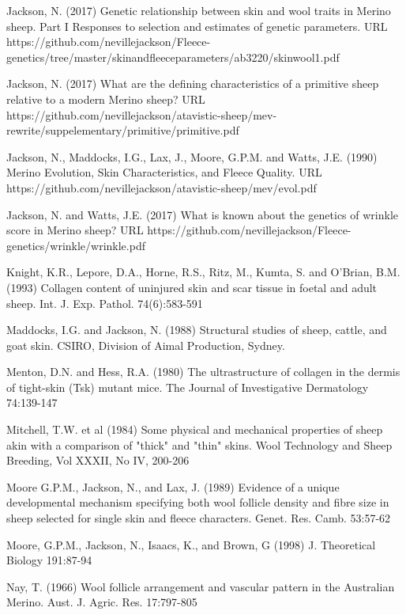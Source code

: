 \documentclass[titlepage]{article}  %
\begin{document}
\begin{thebibliography}{99}
Jackson, N. (2017) Genetic relationship between skin and wool traits in Merino sheep. Part I Responses to selection and estimates of genetic parameters. URL https://github.com/nevillejackson/Fleece-genetics/tree/master/skinandfleeceparameters/ab3220/skinwool1.pdf

Jackson, N. (2017) What are the defining characteristics of a primitive sheep relative to a modern Merino sheep? URL https://github.com/nevillejackson/atavistic-sheep/mev-rewrite/suppelementary/primitive/primitive.pdf

Jackson, N., Maddocks, I.G., Lax, J., Moore, G.P.M. and Watts, J.E. (1990) Merino Evolution, Skin Characteristics, and Fleece Quality. URL https://github.com/nevillejackson/atavistic-sheep/mev/evol.pdf 

Jackson, N. and Watts, J.E. (2017) What is known about the genetics of wrinkle score in Merino sheep? URL https://github.com/nevillejackson/Fleece-genetics/wrinkle/wrinkle.pdf

Knight, K.R., Lepore, D.A., Horne, R.S., Ritz, M., Kumta, S. and O'Brian, B.M. (1993) Collagen content of uninjured skin and scar tissue in foetal and adult sheep. Int. J. Exp. Pathol. 74(6):583-591

Maddocks, I.G. and Jackson, N. (1988) Structural studies of sheep, cattle, and goat skin. CSIRO, Division of Aimal Production, Sydney.

Menton, D.N. and Hess, R.A. (1980) The ultrastructure of collagen in the dermis of tight-skin (Tsk) mutant mice. The Journal of Investigative Dermatology 74:139-147

Mitchell, T.W. et al (1984) Some physical and mechanical properties of sheep akin with a comparison of "thick" and "thin" skins.  Wool Technology and Sheep Breeding, Vol XXXII, No IV, 200-206

Moore G.P.M., Jackson, N., and Lax, J. (1989) Evidence of a unique developmental mechanism specifying both wool follicle density and fibre size in sheep selected for single skin and fleece characters. Genet. Res. Camb. 53:57-62

Moore, G.P.M., Jackson, N., Isaacs, K., and Brown, G (1998) J. Theoretical Biology 191:87-94

Nay, T. (1966) Wool follicle arrangement and vascular pattern in the Australian Merino. Aust. J. Agric. Res. 17:797-805


\end{thebibliography}
\end{document}
